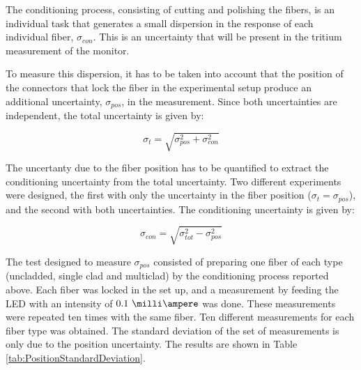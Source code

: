 The conditioning process, consisting of cutting and polishing the fibers, is an individual task that generates a small dispersion in the response of each individual fiber, $\sigma_{con}$. This is an uncertainty that will be present in the tritium measurement of the monitor.


To measure this dispersion, it has to be taken into account that the position of the connectors that lock the fiber in the experimental setup produce an additional uncertainty, $\sigma_{pos}$, in the measurement. Since both uncertainties are independent, the total uncertainty is given by:

\begin{equation}
\sigma_{t} = \sqrt{\sigma^2_{pos} + \sigma^2_{con} }
\label{eq:TotalUncertaintyFiberCharacterization}
\end{equation}

The uncertanty due to the fiber position has to be quantified to extract the conditioning uncertainty from the total uncertainty. Two different experiments were designed, the first with only the uncertainty in the fiber position ($\sigma_{t} = \sigma_{pos}$), and the second with both uncertainties. The conditioning uncertainty is given by:

\begin{equation}
\sigma_{con} = \sqrt{\sigma^2_{tot} - \sigma^2_{pos} }
\label{eq:ConditioningUncertaintyFiberCharacterization}
\end{equation}

The test designed to measure $\sigma_{pos}$ consisted of preparing one fiber of each type (uncladded, single clad and multiclad) by the conditioning process reported above. Each fiber was locked in the set up, and a measurement by feeding the LED with an intensity of $0.1~\milli\ampere$  was done. These measurements were repeated ten times with the same fiber. Ten different measurements for each fiber type was obtained. The standard deviation of the set of measurements is only due to the position uncertainty. The results are shown in Table \ref{tab:PositionStandardDeviation}.

